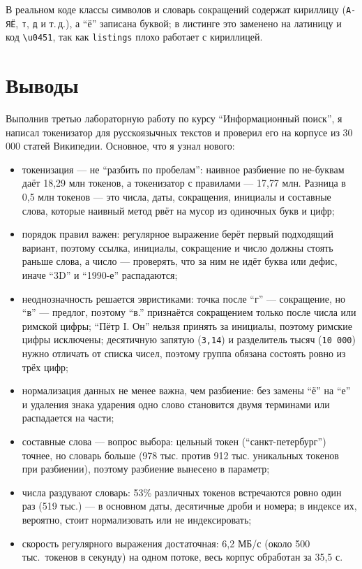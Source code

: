 В реальном коде классы символов и словарь сокращений содержат кириллицу
(\texttt{А-ЯЁ}, \texttt{т}, \texttt{д} и т.\,д.), а \enquote{ё} записана
буквой; в листинге это заменено на латиницу и код \texttt{\textbackslash u0451}, так как
\texttt{listings} плохо работает с кириллицей.

\pagebreak
\section{Выводы}
Выполнив третью лабораторную работу по курсу \enquote{Информационный поиск}, я
написал токенизатор для русскоязычных текстов и проверил его на корпусе из
30\,000 статей Википедии. Основное, что я узнал нового:

\begin{itemize}
    \item токенизация --- не \enquote{разбить по пробелам}: наивное разбиение по
    не-буквам даёт 18{,}29 млн токенов, а токенизатор с правилами --- 17{,}77 млн.
    Разница в 0{,}5 млн токенов --- это числа, даты, сокращения, инициалы и
    составные слова, которые наивный метод рвёт на мусор из одиночных букв и цифр;
    \item порядок правил важен: регулярное выражение берёт первый подходящий
    вариант, поэтому ссылка, инициалы, сокращение и число должны стоять раньше
    слова, а число --- проверять, что за ним не идёт буква или дефис, иначе
    \enquote{3D} и \enquote{1990-е} распадаются;
    \item неоднозначность решается эвристиками: точка после \enquote{г} --- сокращение,
    но \enquote{в} --- предлог, поэтому \enquote{в.} признаётся сокращением только после
    числа или римской цифры; \enquote{Пётр I. Он} нельзя принять за инициалы, поэтому
    римские цифры исключены; десятичную запятую (\texttt{3,14}) и разделитель тысяч
    (\texttt{10 000}) нужно отличать от списка чисел, поэтому группа обязана
    состоять ровно из трёх цифр;
    \item нормализация данных не менее важна, чем разбиение: без замены
    \enquote{ё} на \enquote{е} и удаления знака ударения одно слово становится
    двумя терминами или распадается на части;
    \item составные слова --- вопрос выбора: цельный токен
    (\enquote{санкт-петербург}) точнее, но словарь больше (978 тыс. против
    912 тыс. уникальных токенов при разбиении), поэтому разбиение вынесено в
    параметр;
    \item числа раздувают словарь: 53\% различных токенов встречаются ровно один раз (519 тыс.) --- в
    основном даты, десятичные дроби и номера; в индексе их, вероятно, стоит
    нормализовать или не индексировать;
    \item скорость регулярного выражения достаточная: 6{,}2 МБ/с (около
    500\,тыс.\ токенов в секунду) на одном потоке, весь корпус обработан за 35{,}5 с.
\end{itemize}

